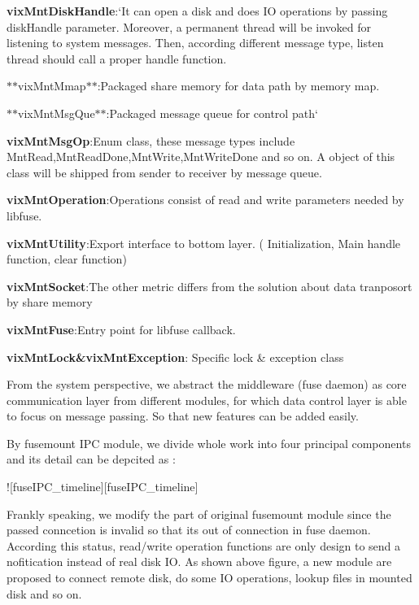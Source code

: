 \begin{DoxyItemize}
\item {\bfseries vix\+Mnt\+Disk\+Handle}\+:`\+It can open a disk and does IO operations by passing disk\+Handle parameter. Moreover, a permanent thread will be invoked for listening to system messages. Then, according different message type, listen thread should call a proper handle function.{\ttfamily }
\item {\ttfamily $\ast$$\ast$vix\+Mnt\+Mmap$\ast$$\ast$\+:}Packaged share memory for data path by memory map.{\ttfamily }
\item {\ttfamily $\ast$$\ast$vix\+Mnt\+Msg\+Que$\ast$$\ast$\+:}Packaged message queue for control path`
\item {\bfseries vix\+Mnt\+Msg\+Op}\+:{\ttfamily Enum class, these message types include Mnt\+Read,Mnt\+Read\+Done,Mnt\+Write,Mnt\+Write\+Done and so on. A object of this class will be shipped from sender to receiver by message queue.}
\item {\bfseries vix\+Mnt\+Operation}\+:{\ttfamily Operations consist of read and write parameters needed by libfuse.}
\item {\bfseries vix\+Mnt\+Utility}\+:{\ttfamily Export interface to bottom layer. ( Initialization, Main handle function, clear function)}
\item {\bfseries vix\+Mnt\+Socket}\+:{\ttfamily The other metric differs from the solution about data tranposort by share memory}
\item {\bfseries vix\+Mnt\+Fuse}\+:{\ttfamily Entry point for libfuse callback.}
\item {\bfseries vix\+Mnt\+Lock\&vix\+Mnt\+Exception}\+: {\ttfamily Specific lock \& exception class}
\end{DoxyItemize}

From the system perspective, we abstract the middleware (fuse daemon) as core communication layer from different modules, for which data control layer is able to focus on message passing. So that new features can be added easily.

By fusemount I\+PC module, we divide whole work into four principal components and its detail can be depcited as \+:

!\mbox{[}fuse\+I\+P\+C\+\_\+timeline\mbox{]}\mbox{[}fuse\+I\+P\+C\+\_\+timeline\mbox{]}

Frankly speaking, we modify the part of original fusemount module since the passed conncetion is invalid so that it\textquotesingle{}s out of connection in fuse daemon. According this status, read/write operation functions are only design to send a nofitication instead of real disk IO. As shown above figure, a new module are proposed to connect remote disk, do some IO operations, lookup files in mounted disk and so on.

